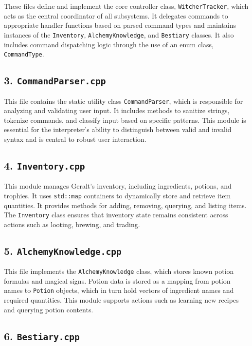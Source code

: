 \documentclass{article}
\begin{document}
These files define and implement the core controller class, \texttt{WitcherTracker}, which acts as the central coordinator of all subsystems. It delegates commands to appropriate handler functions based on parsed command types and maintains instances of the \texttt{Inventory}, \texttt{AlchemyKnowledge}, and \texttt{Bestiary} classes. It also includes command dispatching logic through the use of an enum class, \texttt{CommandType}.

\subsection*{3. \texttt{CommandParser.cpp}}

This file contains the static utility class \texttt{CommandParser}, which is responsible for analyzing and validating user input. It includes methods to sanitize strings, tokenize commands, and classify input based on specific patterns. This module is essential for the interpreter’s ability to distinguish between valid and invalid syntax and is central to robust user interaction.

\subsection*{4. \texttt{Inventory.cpp}}

This module manages Geralt’s inventory, including ingredients, potions, and trophies. It uses \texttt{std::map} containers to dynamically store and retrieve item quantities. It provides methods for adding, removing, querying, and listing items. The \texttt{Inventory} class ensures that inventory state remains consistent across actions such as looting, brewing, and trading.

\subsection*{5. \texttt{AlchemyKnowledge.cpp}}

This file implements the \texttt{AlchemyKnowledge} class, which stores known potion formulas and magical signs. Potion data is stored as a mapping from potion names to \texttt{Potion} objects, which in turn hold vectors of ingredient names and required quantities. This module supports actions such as learning new recipes and querying potion contents.

\subsection*{6. \texttt{Bestiary.cpp}}
\end{document}
